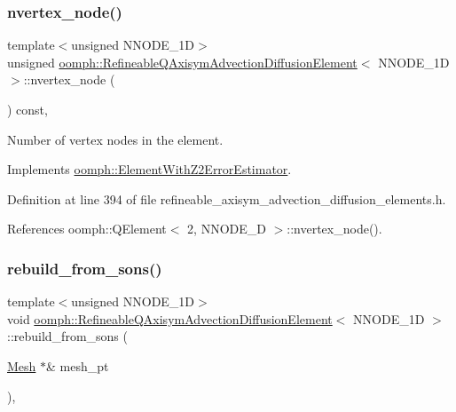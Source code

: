 \subsubsection{\texorpdfstring{nvertex\+\_\+node()}{nvertex\_node()}}
{\footnotesize\ttfamily template$<$unsigned N\+N\+O\+D\+E\+\_\+1D$>$ \\
unsigned \hyperlink{classoomph_1_1RefineableQAxisymAdvectionDiffusionElement}{oomph\+::\+Refineable\+Q\+Axisym\+Advection\+Diffusion\+Element}$<$ N\+N\+O\+D\+E\+\_\+1D $>$\+::nvertex\+\_\+node (\begin{DoxyParamCaption}{ }\end{DoxyParamCaption}) const\hspace{0.3cm}{\ttfamily [inline]}, {\ttfamily [virtual]}}



Number of vertex nodes in the element. 



Implements \hyperlink{classoomph_1_1ElementWithZ2ErrorEstimator_a19495a0e77ef4ff35f15fdf7913b4077}{oomph\+::\+Element\+With\+Z2\+Error\+Estimator}.



Definition at line 394 of file refineable\+\_\+axisym\+\_\+advection\+\_\+diffusion\+\_\+elements.\+h.



References oomph\+::\+Q\+Element$<$ 2, N\+N\+O\+D\+E\+\_\+D $>$\+::nvertex\+\_\+node().

\mbox{\label{classoomph_1_1RefineableQAxisymAdvectionDiffusionElement_a076995e66fdcc001c2b664309a6f7b46}} 
\subsubsection{\texorpdfstring{rebuild\+\_\+from\+\_\+sons()}{rebuild\_from\_sons()}}
{\footnotesize\ttfamily template$<$unsigned N\+N\+O\+D\+E\+\_\+1D$>$ \\
void \hyperlink{classoomph_1_1RefineableQAxisymAdvectionDiffusionElement}{oomph\+::\+Refineable\+Q\+Axisym\+Advection\+Diffusion\+Element}$<$ N\+N\+O\+D\+E\+\_\+1D $>$\+::rebuild\+\_\+from\+\_\+sons (\begin{DoxyParamCaption}\item[{\hyperlink{classoomph_1_1Mesh}{Mesh} $\ast$\&}]{mesh\+\_\+pt }\end{DoxyParamCaption})\hspace{0.3cm}{\ttfamily [inline]}, {\ttfamily [virtual]}}



